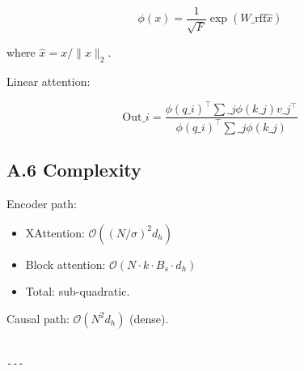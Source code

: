 \[
\phi(x) = \frac{1}{\sqrt{F}} \exp(W\_\text{rff} \hat{x})
\tag{A.6}
\]

where $\hat{x} = x / \|x\|_2$.

Linear attention:

\[
\text{Out}\_i = \frac{\phi(q\_i)^\top \sum\_j \phi(k\_j) v\_j^\top}{\phi(q\_i)^\top \sum\_j \phi(k\_j)}
\tag{A.7}
\]

\subsection{A.6 Complexity}

Encoder path:
\begin{itemize}
\item XAttention: $\mathcal{O}((N/\sigma)^2 d_h)$
\item Block attention: $\mathcal{O}(N \cdot k \cdot B_s \cdot d_h)$
\item Total: sub-quadratic.

\end{itemize}
Causal path: $\mathcal{O}(N^2 d_h)$ (dense).
\begin{lstlisting}

---
\end{lstlisting}